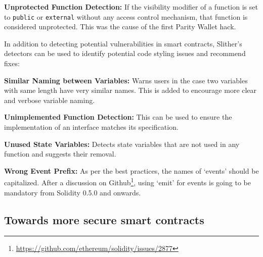 \textbf{Unprotected Function Detection:} If the visibility modifier of a function is set to \texttt{public} or \texttt{external} without any access control mechanism, that function is considered unprotected. This was the cause of the first Parity Wallet hack.

In addition to detecting potential vulnerabilities in smart contracts, Slither's detectors can be used to identify potential code styling issues and recommend fixes:

\textbf{Similar Naming between Variables:} Warns users in the case two variables with same length have very similar names. This is added to encourage more clear and verbose variable naming.

\textbf{Unimplemented Function Detection:} This can be used to ensure the implementation of an interface matches its specification.

\textbf{Unused State Variables:} Detects state variables that are not used in any function and suggests their removal.

\textbf{Wrong Event Prefix:} As per the best practices, the names of `events' should be capitalized. After a discussion on Github\footnote{\url{https://github.com/ethereum/solidity/issues/2877}}, using `emit' for events is going to be mandatory from Solidity 0.5.0 and onwards.




\subsection{Towards more secure smart contracts}

